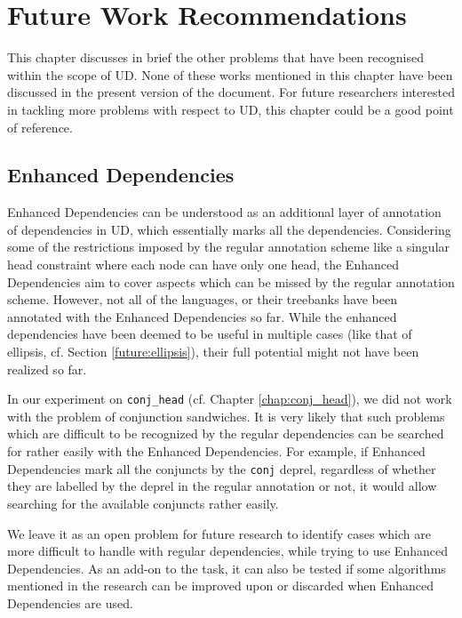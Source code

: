\chapter{Future Work Recommendations}
\label{chap:future}

This chapter discusses in brief the other problems that have been recognised within the scope of UD. None of these works mentioned in this chapter have been discussed in the present version of the document. For future researchers interested in tackling more problems with respect to UD, this chapter could be a good point of reference. 

\section{Enhanced Dependencies}
\label{future:enhanced}

Enhanced Dependencies can be understood as an additional layer of annotation of dependencies in UD, which essentially marks all the dependencies. Considering some of the restrictions imposed by the regular annotation scheme like a singular head constraint where each node can have only one head, the Enhanced Dependencies aim to cover aspects which can be missed by the regular annotation scheme. However, not all of the languages, or their treebanks have been annotated with the Enhanced Dependencies so far. While the enhanced dependencies have been deemed to be useful in multiple cases (like that of ellipsis, cf. Section \ref{future:ellipsis}), their full potential might not have been realized so far.

In our experiment on \verb|conj_head| (cf. Chapter \ref{chap:conj_head}), we did not work with the problem of conjunction sandwiches. It is very likely that such problems which are difficult to be recognized by the regular dependencies can be searched for rather easily with the Enhanced Dependencies. For example, if Enhanced Dependencies mark all the conjuncts by the \texttt{conj} deprel, regardless of whether they are labelled by the deprel in the regular annotation or not, it would allow searching for the available conjuncts rather easily.

We leave it as an open problem for future research to identify cases which are more difficult to handle with regular dependencies, while trying to use Enhanced Dependencies. As an add-on to the task, it can also be tested if some algorithms mentioned in the research can be improved upon or discarded when Enhanced Dependencies are used.

